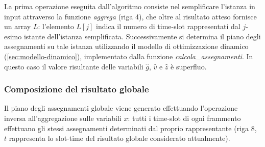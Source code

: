 La prima operazione eseguita dall'algoritmo consiste nel semplificare l'istanza in input attraverso la funzione \textit{aggrega} (riga 4), che oltre al risultato atteso fornisce un array $L$: l'elemento $L[j]$ indica il numero di time-slot rappresentati dal $j$-esimo istante dell'istanza semplificata. Successivamente si determina il piano degli assegnamenti su tale istanza utilizzando il modello di ottimizzazione dinamico (\autoref{sec:modello-dinamico}), implementato dalla funzione \textit{calcola\_assegnamenti}. In questo caso il valore risultante delle variabili $\hat{g}$, $\hat{v}$ e $\hat{z}$ è superfluo.

\subsubsection{Composizione del risultato globale}

Il piano degli assegnamenti globale viene generato effettuando l'operazione inversa all'aggregazione sulle variabili $x$: tutti i time-slot di ogni frammento effettuano gli stessi assegnamenti determinati dal proprio rappresentante (riga 8, $t$ rappresenta lo slot-time del risultato globale considerato attualmente).

